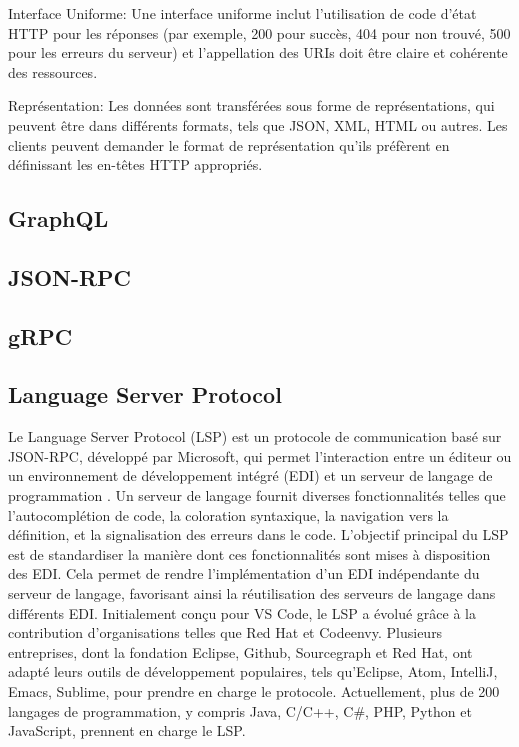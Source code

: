 Interface Uniforme: Une interface uniforme inclut l'utilisation de code d'état HTTP pour les réponses (par exemple, 200 pour succès, 404 pour non trouvé, 500 pour les erreurs du serveur) et l'appellation des URIs doit être claire et cohérente des ressources.

Représentation: Les données sont transférées sous forme de représentations, qui peuvent être dans différents formats, tels que JSON, XML, HTML ou autres. Les clients peuvent demander le format de représentation qu'ils préfèrent en définissant les en-têtes HTTP appropriés.

\cite{Piao2018}

\cite{fielding2000architectural}

\cite{Johnson2022}

\subsection{GraphQL}

\cite{Vadlamani2021}

\subsection{JSON-RPC}

\subsection{gRPC}

\subsection{Language Server Protocol}

Le Language Server Protocol (LSP) est un protocole de communication basé sur JSON-RPC, développé par Microsoft, qui permet l'interaction entre un éditeur ou un environnement de développement intégré (EDI) et un serveur de langage de programmation \cite{Keidel2016}. Un serveur de langage fournit diverses fonctionnalités telles que l'autocomplétion de code, la coloration syntaxique, la navigation vers la définition, et la signalisation des erreurs dans le code. L'objectif principal du LSP est de standardiser la manière dont ces fonctionnalités sont mises à disposition des EDI. Cela permet de rendre l'implémentation d'un EDI indépendante du serveur de langage, favorisant ainsi la réutilisation des serveurs de langage dans différents EDI. Initialement conçu pour VS Code, le LSP a évolué grâce à la contribution d'organisations telles que Red Hat et Codeenvy. Plusieurs entreprises, dont la fondation Eclipse, Github, Sourcegraph et Red Hat, ont adapté leurs outils de développement populaires, tels qu'Eclipse, Atom, IntelliJ, Emacs, Sublime, pour prendre en charge le protocole. Actuellement, plus de 200 langages de programmation, y compris Java, C/C++, C\#, PHP, Python et JavaScript, prennent en charge le LSP.

